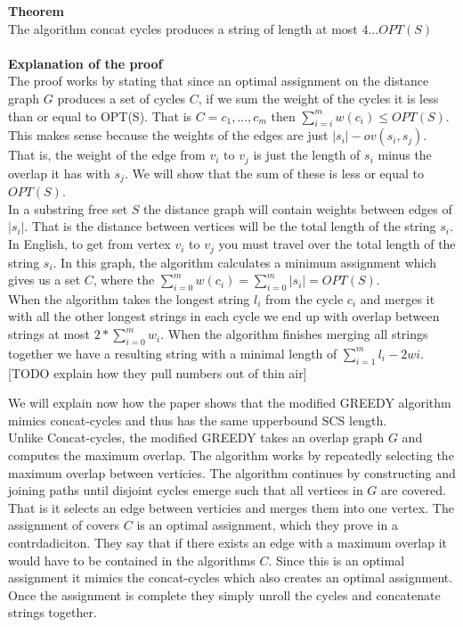 \documentclass[letterpaper,11pt,titlepage]{article}
\begin{document}
\textbf{Theorem}\\
The algorithm concat cycles produces a string of length at most $4\ldots OPT(S)$\\\\

\textbf{Explanation of the proof}\\

The proof works by stating that since an optimal assignment on the distance graph $G$ produces a set of cycles $C$, if we sum the weight of the cycles it is less than or equal to OPT(S). That is $C = {c_1, ..., c_m}$ then $\sum_{i=i}^m w(c_i) \leq OPT(S)$.\\
This makes sense because the weights of the edges are just $|s_i| - ov(s_i,s_j)$. That is, the weight of the edge from $v_i$ to $v_j$ is just the length of $s_i$ minus the overlap it has with $s_j$. We will show that the sum of these is less or equal to $OPT(S)$.\\

In a substring free set $S$ the distance graph will contain weights between edges of $|s_i|$. That is the distance between vertices will be the total length of the string $s_i$. In English, to get from vertex $v_i$ to $v_j$ you must travel over the total length of the string $s_i$. In this graph, the algorithm calculates a minimum assignment which gives us a set $C$, where the  $\sum_{i=0}^m w(c_i) = \sum_{i=0}^m |s_i| = OPT(S)$.\\

When the algorithm takes the longest string $l_i$ from the cycle $c_i$ and merges it with all the other longest strings in each cycle we end up with overlap between strings at most $2*\sum_{i=0}^m w_i$. When the algorithm finishes merging all strings together we have a resulting string with a minimal length of $\sum_{i=1}^m l_i - 2wi$. [TODO explain how they pull numbers out of thin air]

We will explain now how the paper shows that the modified GREEDY algorithm mimics concat-cycles and thus has the same upperbound SCS length.\\

Unlike Concat-cycles, the modified GREEDY takes an overlap graph $G$ and computes the maximum overlap. The algorithm works by repeatedly selecting the maximum overlap between verticies. The algorithm continues by constructing and joining paths until disjoint cycles emerge such that all vertices in $G$ are covered. That is it selects an edge between verticies and merges them into one vertex. The assignment of covers $C$ is an optimal assignment, which they prove in a contrdadiciton. They say that if there exists an edge with a maximum overlap it would have to be contained in the algorithms $C$. Since this is an optimal assignment it mimics the concat-cycles which also creates an optimal assignment. Once the assignment is complete they simply unroll the cycles and concatenate strings together. 
\end{document}
